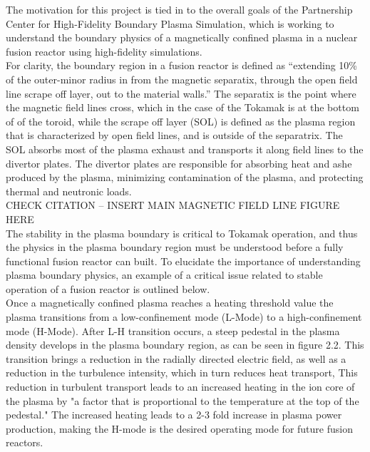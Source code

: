 \documentclass{article}
\begin{document}
The motivation for this project is tied in to the overall goals of the Partnership Center for High-Fidelity Boundary Plasma Simulation, which is working to understand the boundary physics of a magnetically confined plasma in a nuclear fusion reactor using high-fidelity simulations. \cite{PPPL_P:2}\\

For clarity, the boundary region in a fusion reactor is defined as “extending 10\% of the outer-minor radius in from the magnetic separatix, through the open field line scrape off layer, out to the material walls.” The separatix is the point where the magnetic field lines cross, which in the case of the Tokamak is at the bottom of of the toroid, while the scrape off layer (SOL) is defined as the plasma region that is characterized by open field lines, and is outside of the separatrix. The SOL absorbs most of the plasma exhaust and transports it along field lines to the divertor plates. The divertor plates are responsible for absorbing heat and ashe produced by the plasma, minimizing contamination of the plasma, and protecting thermal and neutronic loads.\\

CHECK CITATION – INSERT MAIN MAGNETIC FIELD LINE FIGURE HERE\\

The stability in the plasma boundary is critical to Tokamak operation, and thus the physics in the plasma boundary region must be understood before a fully functional fusion reactor can built. To elucidate the importance of understanding plasma boundary physics, an example of a critical issue related to stable operation of a fusion reactor is outlined below.\\

Once a magnetically confined plasma reaches a heating threshold value the plasma transitions from a low-confinement mode (L-Mode) to a high-confinement mode (H-Mode). After L-H transition occurs, a steep pedestal in the plasma density develops in the plasma boundary region, as can be seen in figure 2.2. This transition brings a reduction in the radially directed electric field, as well as a reduction in the turbulence intensity, which in turn reduces heat transport, This reduction in turbulent transport leads to an increased heating in the ion core of the plasma by "a factor that is proportional to the temperature at the top of the pedestal." \cite{PPPL_P:2} The increased heating leads to a 2-3 fold increase in plasma power production, making the H-mode is the desired operating mode for future fusion reactors.\\
\end{document}
